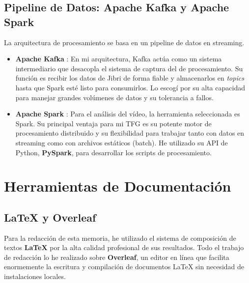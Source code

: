 \subsection{Pipeline de Datos: Apache Kafka y Apache Spark}
La arquitectura de procesamiento se basa en un pipeline de datos en streaming.
\begin{itemize}
    \item \textbf{Apache Kafka} \cite{KafkaWebDoc}: En mi arquitectura, Kafka actúa como un sistema intermediario que desacopla el sistema de captura del de procesamiento. Su función es recibir los datos de Jibri de forma fiable y almacenarlos en \textit{topics} hasta que Spark esté listo para consumirlos. Lo escogí por su alta capacidad para manejar grandes volúmenes de datos y su tolerancia a fallos.
    \item \textbf{Apache Spark} \cite{SparkWebDoc}: Para el análisis del vídeo, la herramienta seleccionada es Spark. Su principal ventaja para mi TFG es su potente motor de procesamiento distribuido y su flexibilidad para trabajar tanto con datos en streaming como con archivos estáticos (batch). He utilizado su API de Python, \textbf{PySpark}, para desarrollar los scripts de procesamiento.
\end{itemize}

\section{Herramientas de Documentación}
\subsection{\LaTeX{} y Overleaf}
Para la redacción de esta memoria, he utilizado el sistema de composición de textos \textbf{\LaTeX{}} \cite{wiki:latex} por la alta calidad profesional de sus resultados. Todo el trabajo de redacción lo he realizado sobre \textbf{Overleaf}, un editor en línea que facilita enormemente la escritura y compilación de documentos \LaTeX{} sin necesidad de instalaciones locales.